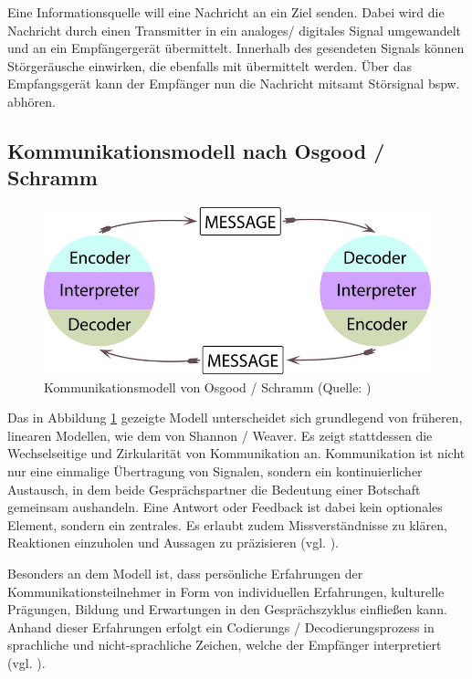 Eine Informationsquelle will eine Nachricht an ein Ziel senden. Dabei wird die Nachricht durch einen Transmitter in ein analoges/ digitales Signal umgewandelt und an ein Empfängergerät übermittelt. Innerhalb des gesendeten Signals können Störgeräusche einwirken, die ebenfalls mit übermittelt werden. Über das Empfangsgerät kann der Empfänger nun die Nachricht mitsamt Störsignal bspw. abhören.

\subsection{Kommunikationsmodell nach Osgood / Schramm}

\begin{figure}[ht]
\centering
\includegraphics[width=1\linewidth]{content/pictures/osgood-schramm.jpg}
\caption{Kommunikationsmodell von Osgood / Schramm (Quelle: \cite{wrench_24_2021})}
\label{fig:osgood-schramm-modell}
\end{figure}

Das in Abbildung \ref{fig:osgood-schramm-modell} gezeigte Modell unterscheidet sich grundlegend von früheren, linearen Modellen, wie dem von Shannon / Weaver. Es zeigt stattdessen die Wechselseitige und Zirkularität von Kommunikation an. Kommunikation ist nicht nur eine einmalige Übertragung von Signalen, sondern ein kontinuierlicher Austausch, in dem beide Gesprächspartner die Bedeutung einer Botschaft gemeinsam aushandeln. Eine Antwort oder Feedback ist dabei kein optionales Element, sondern ein zentrales. Es erlaubt zudem Missverständnisse zu klären, Reaktionen einzuholen und Aussagen zu präzisieren (vgl. \cite{noauthor_osgood_2024}). 

Besonders an dem Modell ist, dass persönliche Erfahrungen der Kommunikationsteilnehmer in Form von individuellen Erfahrungen, kulturelle Prägungen, Bildung und Erwartungen in den Gesprächszyklus einfließen kann. Anhand dieser Erfahrungen erfolgt ein Codierungs / Decodierungsprozess in sprachliche und nicht-sprachliche Zeichen, welche der Empfänger interpretiert (vgl. \cite{noauthor_osgood_2024}). 

